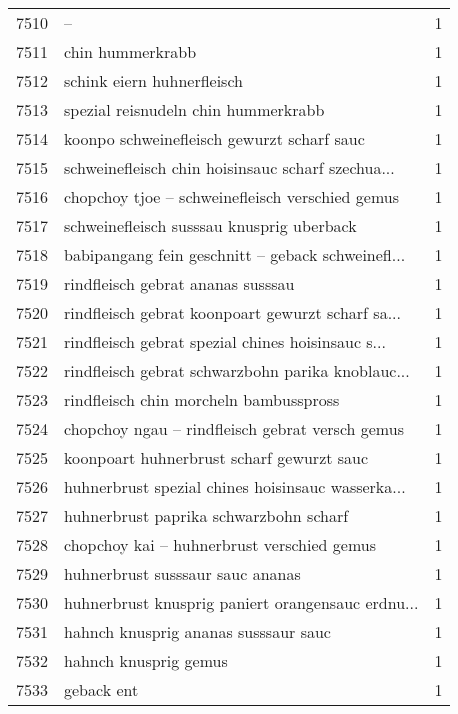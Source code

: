\begin{tabular}{llr}
7510 &                                                  – &      1 \\
7511 &                                   chin hummerkrabb &      1 \\
7512 &                         schink eiern huhnerfleisch &      1 \\
7513 &                spezial reisnudeln chin hummerkrabb &      1 \\
7514 &         koonpo schweinefleisch gewurzt scharf sauc &      1 \\
7515 &  schweinefleisch chin hoisinsauc scharf szechua... &      1 \\
7516 &    chopchoy tjoe – schweinefleisch verschied gemus &      1 \\
7517 &          schweinefleisch susssau knusprig uberback &      1 \\
7518 &  babipangang fein geschnitt – geback schweinefl... &      1 \\
7519 &                  rindfleisch gebrat ananas susssau &      1 \\
7520 &  rindfleisch gebrat koonpoart gewurzt scharf sa... &      1 \\
7521 &  rindfleisch gebrat spezial chines hoisinsauc s... &      1 \\
7522 &  rindfleisch gebrat schwarzbohn parika knoblauc... &      1 \\
7523 &             rindfleisch chin morcheln bambusspross &      1 \\
7524 &    chopchoy ngau – rindfleisch gebrat versch gemus &      1 \\
7525 &          koonpoart huhnerbrust scharf gewurzt sauc &      1 \\
7526 &  huhnerbrust spezial chines hoisinsauc wasserka... &      1 \\
7527 &             huhnerbrust paprika schwarzbohn scharf &      1 \\
7528 &         chopchoy kai – huhnerbrust verschied gemus &      1 \\
7529 &                   huhnerbrust susssaur sauc ananas &      1 \\
7530 &  huhnerbrust knusprig paniert orangensauc erdnu... &      1 \\
7531 &               hahnch knusprig ananas susssaur sauc &      1 \\
7532 &                              hahnch knusprig gemus &      1 \\
7533 &                                         geback ent &      1 \\

\end{tabular}
